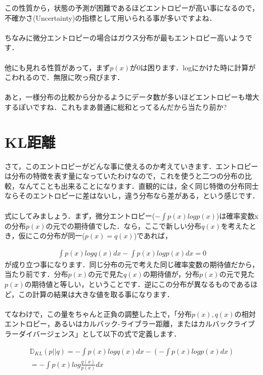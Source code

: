 \documentclass[11pt,a4paper,uplatex]{ujreport}
\begin{document}
この性質から，状態の予測が困難であるほどエントロピーが高い事になるので，不確かさ(Uncertainty)の指標として用いられる事が多いですよね．\\
\\

ちなみに微分エントロピーの場合はガウス分布が最もエントロピー高いようです．\\
\\

他にも見れる性質があって，まず$p(x)$が0は困ります．logにかけた時に計算がこわれるので．無限に吹っ飛びます．\\
\\

あと，一様分布の比較から分かるようにデータ数が多いほどエントロピーも増大するぽいですね．これもまあ普通に総和とってるんだから当たり前か?

\section{KL距離}
さて，このエントロピーがどんな事に使えるのか考えていきます．エントロピーは分布の特徴を表す量になっていたわけなので，これを使うと二つの分布の比較，なんてことも出来ることになります．直観的には，全く同じ特徴の分布同士ならそのエントロピーに差はないし，違う分布なら差がある，という感じです．\\
\\

式にしてみましょう．まず，微分エントロピー($- \int p(x) log p(x)$)は確率変数xの分布$p(x)$の元での期待値でした．なら，ここで新しい分布$q(x)$を考えたとき，仮にこの分布が同一($p(x) = q(x)$)であれば，

\begin{eqnarray}
\label{eq:KL1}
  \int p(x) log q(x)dx - \int p(x) log p(x)dx= 0
\end{eqnarray}
が成り立つ事になります．同じ分布の元で考えた同じ確率変数の期待値だから，当たり前です．分布$p(x)$の元で見た$q(x)$の期待値が，分布$p(x)$の元で見た$p(x)$の期待値と等しい，ということです．逆にこの分布が異なるものであるほど，この計算の結果は大きな値を取る事になります．\\
\\

てなわけで，この量をちゃんと正負の調整した上で，「分布$p(x), q(x)$の相対エントロピー，あるいはカルバック-ライブラー距離，またはカルバックライブラーダイバージェンス」として以下の式で定義します\cite{prml}．

\begin{eqnarray}
\label{eq:KLD}
  \mathbb{D}_{KL}(p||q) = - \int p(x) log q(x)dx - (-\int p(x) log p(x)dx)\\
  = -\int p(x) log \frac{q(x)}{p(x)} dx
\end{eqnarray}
\end{document}
